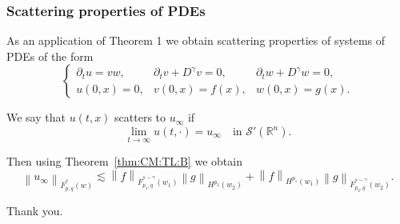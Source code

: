 \documentclass[xcolor=dvipsnames]{beamer}
\newcommand{\rn}{{{\mathbb R}^n}}
\newcommand{\norm}[2]{{\left\| #1 \right\|}_{#2}}
\newcommand{\swp}{{\mathcal{S}'}(\rn)}
\newcommand{\tlw}[4]{\dot F_{#1,#3}^{#2}(#4)} %
\begin{document}
\begin{frame}\frametitle{Scattering properties of PDEs}
As an application of Theorem 1 we obtain scattering properties of systems of PDEs of the form
\begin{equation*}\label{eq:Ds:Ds}
\left\{ \begin{array}{lll}  \partial_t u =vw, & \partial_t v +D^\gamma v = 0, & \partial_t w + D^\gamma w = 0, \\
  u(0,x)=0,&v(0,x)=f(x),&w(0,x) = g(x).
 \end{array} \right.
\end{equation*}

\bigskip

We say that $u(t,x)$ scatters to $u_\infty$ if
\begin{equation*}\label{def:u:infty}
\lim\limits_{t \to \infty} u(t, \cdot ) = u_\infty \quad \text{in } \swp.
\end{equation*}

\bigskip

Then using Theorem~\ref{thm:CM:TL:B} we obtain
\begin{equation*}\label{eq:scattering1}
\norm{u_\infty}{\tlw{p}{s}{q}{w}} \lesssim \norm{f}{\tlw{p_1}{s-\gamma}{q}{w_1} } \norm{g}{H^{p_2}(w_2)} +  \norm{f}{H^{p_1}(w_1)}   \norm{g}{\tlw{p_2}{s-\gamma}{q}{w_2} }.
\end{equation*}

\end{frame}

\begin{frame}
Thank you.
\end{frame}
\end{document}
